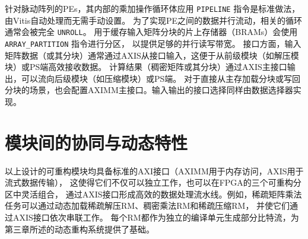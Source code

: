 针对脉动阵列的PEs，其内部的乘加操作循环体应用 \verb|PIPELINE| 指令是标准做法，由Vitis自动处理而无需手动设置。
为了实现PE之间的数据并行流动，相关的循环通常会被完全 \verb|UNROLL|。
用于缓存输入矩阵分块的片上存储器（BRAMs）会使用 \verb|ARRAY_PARTITION| 指令进行分区，
以提供足够的并行读写带宽。
接口方面，输入矩阵数据（或其分块）通常通过AXIS从接口输入，这便于从前级模块（如解压模块）或PS端高效接收数据。
计算结果（稠密矩阵或其分块）通过AXIS主接口输出，可以流向后级模块（如压缩模块）或PS端。
对于直接从主存加载分块或写回分块的场景，也会配置AXIMM主接口。输入输出的接口选择同样由数据选择器实现。

\section{模块间的协同与动态特性}

以上设计的可重构模块均具备标准的AXI接口（AXIMM用于内存访问，AXIS用于流式数据传输），
这使得它们不仅可以独立工作，也可以在FPGA的三个可重构分区中灵活组合，
通过AXIS接口形成高效的数据处理流水线。例如，稀疏矩阵乘法任务可以通过动态加载稀疏解压RM、稠密乘法RM和稀疏压缩RM，
并使它们通过AXIS接口依次串联工作。
每个RM都作为独立的编译单元生成部分比特流，为第三章所述的动态重构系统提供了基础。
